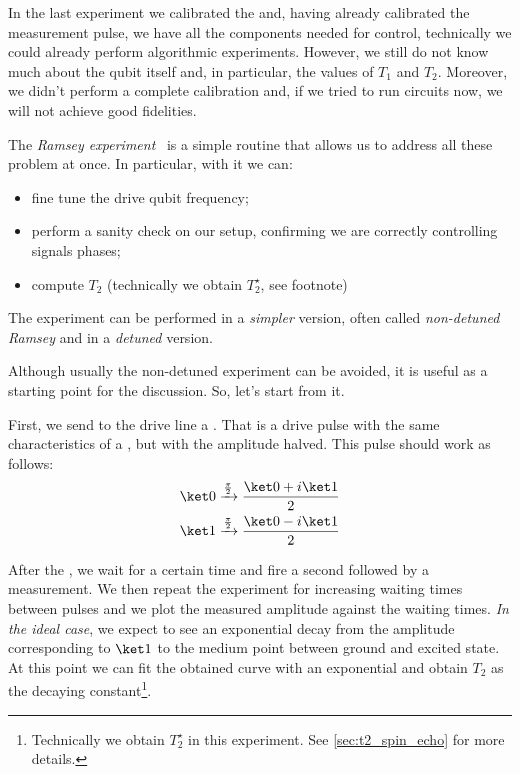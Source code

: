 
In the last experiment we calibrated the \pipulse and, having already calibrated the measurement pulse, we have all the components needed for control, technically we could already perform algorithmic experiments.
However, we still do not know much about the qubit itself and, in particular, the values of $T_1$ and $T_2$.
Moreover, we didn't perform a complete calibration and, if we tried to run circuits now, we will not achieve good fidelities.

The \textit{Ramsey experiment}~\cite{Ramsey1950} is a simple routine that allows us to address all these problem at once. 
In particular, with it we can:
\begin{itemize}
    \item fine tune the drive qubit frequency;
    \item perform a sanity check on our setup, confirming we are correctly controlling signals phases;
    \item compute $T_2$ (technically we obtain $T_2^\star$, see footnote)
\end{itemize}

The experiment can be performed in a \textit{simpler} version, often called \textit{non-detuned Ramsey} and in a \textit{detuned} version.

Although usually the non-detuned experiment can be avoided, it is useful as a starting point for the discussion.
So, let's start from it. 

First, we send to the drive line a \pihpulse.
That is a drive pulse with the same characteristics of a \pipulse, but with the amplitude halved.
This pulse should work as follows:
\begin{align*}
    \ket 0 &\xrightarrow{\frac{\pi}{2}} \frac{\ket 0 + i\ket 1}{2}\\
    \ket 1 &\xrightarrow{\frac{\pi}{2}} \frac{\ket 0 - i\ket 1}{2} 
\end{align*}

After the \pihpulse, we wait for a certain time and fire a second \pihpulse followed by a measurement.
We then repeat the experiment for increasing waiting times between pulses and we plot the measured amplitude against the waiting times.
\textit{In the ideal case}, we expect to see an exponential decay from the amplitude corresponding to $\ket 1$ to the medium point between ground and excited state.
At this point we can fit the obtained curve with an exponential and obtain $T_2$ as the decaying constant\footnote{Technically we obtain $T_2^\star$ in this experiment. See \cref{sec:t2_spin_echo} for more details.}.

